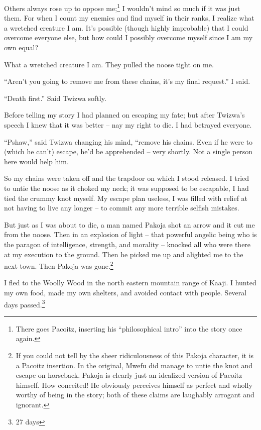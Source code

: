 Others always rose up to oppose me;\footnote{There goes Pacoitz, inserting his ``philosophical intro'' into the story once again.}
I wouldn't mind so much if it was just them.
For when I count my enemies and find myself in their ranks, I realize what a wretched creature I am.
It's possible (though highly improbable) that I could overcome everyone else, but how could I possibly overcome myself since I am my own equal?

What a wretched creature I am. They pulled the noose tight on me.

``Aren't you going to remove me from these chains, it's my final request.'' I said.

``Death first.'' Said Twizwa softly.

Before telling my story I had planned on escaping my fate; but after Twizwa's speech I knew that it was better -- nay my right to die. I had betrayed everyone.

``Pshaw,'' said Twizwa changing his mind, ``remove his chains. Even if he were to (which he can't) escape, he'd be apprehended -- very shortly. Not a single person here would help him.

So my chains were taken off and the trapdoor on which I stood released. I tried to untie the noose as it choked my neck; it was supposed to be escapable, I had tied the crummy knot myself. My escape plan useless, I was filled with relief at not having to live any longer -- to commit any more terrible selfish mistakes.

But just as I was about to die, a man named Pakoja shot an arrow and it cut me from the noose. Then in an explosion of light -- that powerful angelic being who is the paragon of intelligence, strength, and morality -- knocked all who were there at my execution to the ground. Then he picked me up and alighted me to the next town. Then Pakoja was gone.\footnote{If you could not tell by the sheer ridiculousness of this Pakoja character, it is a Pacoitz insertion. In the original, Mwefu did manage to untie the knot and escape on horseback. Pakoja is clearly just an idealized version of Pacoitz himself. How conceited! He obviously perceives himself as perfect and wholly worthy of being in the story; both of these claims are laughably arrogant and ignorant.}

I fled to the Woolly Wood in the north eastern mountain range of Kaaji. I hunted my own food, made my own shelters, and avoided contact with people. Several days passed.\footnote{27 days}

\tbreak


